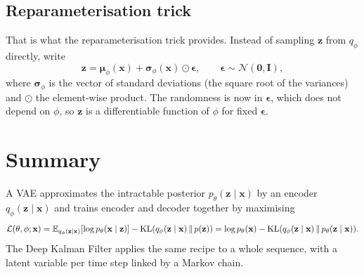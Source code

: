 \subsection{Reparameterisation trick}

That is what the reparameterisation trick provides. Instead of sampling
$\mathbf{z}$ from $q_\phi$ directly, write
\begin{equation*}
    \mathbf{z} = \boldsymbol{\mu}_{\phi}(\mathbf{x}) +
    \boldsymbol{\sigma}_{\phi}(\mathbf{x}) \odot \boldsymbol{\epsilon},
    \qquad \boldsymbol{\epsilon} \sim \mathcal{N}(\mathbf{0},
    \mathbf{I}),
\end{equation*}
where $\boldsymbol{\sigma}_{\phi}$ is the vector of standard deviations
(the square root of the variances) and $\odot$ the element-wise product.
The randomness is now in $\boldsymbol{\epsilon}$, which does not depend
on $\phi$, so $\mathbf{z}$ is a differentiable function of $\phi$ for
fixed $\boldsymbol{\epsilon}$.

\section{Summary}

A VAE approximates the intractable posterior
$p_\theta(\mathbf{z} \mid \mathbf{x})$ by an encoder
$q_\phi(\mathbf{z} \mid \mathbf{x})$ and trains encoder and decoder
together by maximising
\begin{equation*}
    \mathcal{L}(\theta, \phi; \mathbf{x}) =
    \mathbb{E}_{q_\phi(\mathbf{z} \mid \mathbf{x})}[\log
    p_\theta(\mathbf{x} \mid \mathbf{z})]
    - \mathrm{KL}(q_\phi(\mathbf{z} \mid \mathbf{x}) \,\|\, p(\mathbf{z}))
    = \log p_\theta(\mathbf{x}) -
    \mathrm{KL}(q_\phi(\mathbf{z} \mid \mathbf{x}) \,\|\,
    p_\theta(\mathbf{z} \mid \mathbf{x})).
\end{equation*}
The Deep Kalman Filter applies the same recipe to a whole sequence, with
a latent variable per time step linked by a Markov chain.
